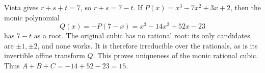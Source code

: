 Vieta gives $r+s+t=7$, so $r+s=7-t$. If $P(x)=x^3-7x^2+3x+2$, then the monic polynomial
\[
Q(x)=-P(7-x)=x^3-14x^2+52x-23
\]
has $7-t$ as a root. The original cubic has no rational root: its only candidates are $\pm1,\pm2$, and none works. It is therefore irreducible over the rationals, as is its invertible affine transform $Q$. This proves uniqueness of the monic rational cubic. Thus $\boxed{A+B+C=-14+52-23=15}$.
